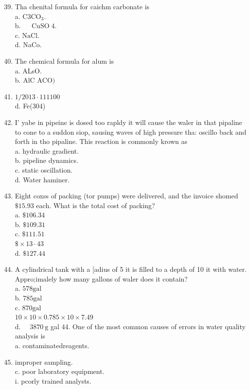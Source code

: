 \documentclass[10pt]{article}
\begin{document}
\begin{enumerate}
  \setcounter{enumi}{38}
  \item Tha chenital formula for caichm carbonate is\\
a. $\mathrm{C} 3 \mathrm{CO}_{3}$.\\
b. $\quad \operatorname{CuSO} 4$.\\
c. $\mathrm{NaCl}$.\\
d. NaCo.

  \item The chemical formula for alum is\\
a. ALsO.\\
b. AlC $\mathrm{ACO})$

  \item $1 / 2013 \cdot 111100$\\
d. Fe(304)

  \item I' yabe in pipeine is dosed too rapldy it will cause the waler in that pipaline to cone to a suddon siop, sausing waves of high pressure tha: oscillo back and forth in tho pipaline. This reaction is commonly krown as\\
a. hydraulic gradient.\\
b. pipeline dynamics.\\
c. static oscillation.\\
d. Water haminer.

  \item Eight coxss of packing (tor pumps) were delivered, and the invoice shomed $\$ 15.93$ each. What is the total cost of packing?\\
a. $\$ 106.34$\\
b. $\$ 109.31$\\
c. $\$ 111.51$\\
$\$ \times 13 \cdot 43$\\
d. $\$ 127.44$

  \item A cylindrical tank with a [adius of 5 it is filled to a depth of 10 it with water. Appro;imalely how many gallons of waler does it contain?\\
a. $578 \mathrm{gal}$\\
b. $785 \mathrm{gal}$\\
c. $870 \mathrm{gal}$\\
$10 \times 10 \times 0.785 \times 10 \times 7.49$\\
d. $\quad 3870 \mathrm{~g}$ gal 44. One of the most common causes of errors in water quality analysis is\\
a. contaminatedreagents.

  \item improper sampling.\\
c. poor laboratory equipment.\\
i. pcorly trained analysts.

\end{enumerate}
\end{document}
